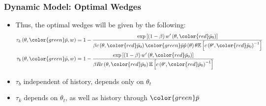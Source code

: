 \documentclass{beamer}
\begin{document}



\begin{frame}
    \frametitle{Dynamic Model: Optimal Wedges}

    \begin{itemize}
        \item Thus, the optimal wedges will be given by the following: 
        \begin{align*}
            \tau_{k}\left(\theta,{\color{green}\bar{p}},w\right)&=1-\frac{\exp\left[\left(1-\beta\right)w^{\prime}\left(\theta,{\color{red}\bar{p}_{0}}\right)\right]}{\beta c\left(\theta,{\color{red}\bar{p}_{0}}\right){\color{green}\bar{p}}\hat{p}\left(\theta\right)\theta\mathbb{E}\left[c\left(\theta^{\prime},{\color{red}\bar{p}_{0}}\right)^{-1}\right]}\\\tau_{b}\left(\theta,{\color{green}\bar{p}},w\right)&=1-\frac{\exp\left[\left(1-\beta\right)w^{\prime}\left(\theta,{\color{red}\bar{p}_{0}}\right)\right]}{\beta Rc\left(\theta,{\color{red}\bar{p}_{0}}\right)\mathbb{E}\left[c\left(\theta^{\prime},{\color{red}\bar{p}_{0}}\right)^{-1}\right]}
        \end{align*}
        \item \( \tau_b \) independent of history, depends only on \( \theta_t \)
        \item \( \tau_k \) depends on \( \theta_t \), as well as history through \( {\color{green}\bar{p}} \)
    \end{itemize}

\end{frame}
\end{document}
